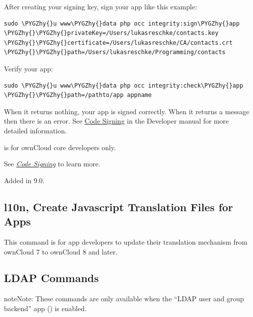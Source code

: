 \documentclass[letterpaper,10pt,english]{sphinxmanual}
\def\PYGZhy{\char`\-}
\begin{document}
After creating your signing key, sign your app like this example:

\begin{Verbatim}[commandchars=\\\{\}]
sudo \PYGZhy{}u www\PYGZhy{}data php occ integrity:sign\PYGZhy{}app \PYGZhy{}\PYGZhy{}privateKey=/Users/lukasreschke/contacts.key \PYGZhy{}\PYGZhy{}certificate=/Users/lukasreschke/CA/contacts.crt \PYGZhy{}\PYGZhy{}path=/Users/lukasreschke/Programming/contacts
\end{Verbatim}

Verify your app:

\begin{Verbatim}[commandchars=\\\{\}]
sudo \PYGZhy{}u www\PYGZhy{}data php occ integrity:check\PYGZhy{}app \PYGZhy{}\PYGZhy{}path=/pathto/app appname
\end{Verbatim}

When it returns nothing, your app is signed correctly. When it returns a message then there is an error. See \href{https://doc.owncloud.org/server/9.0/developer\_manual/app/code\_signing.html\#how-to-get-your-app-signed}{Code Signing} in the Developer manual for more detailed information.

 is for ownCloud core developers only.

See {\hyperref[issues/code_signing::doc]{\emph{Code Signing}}} to learn more.

Added in 9.0.


\subsection{l10n, Create Javascript Translation Files for Apps}
\label{configuration_server/occ_command:l10n-create-javascript-translation-files-for-apps}\label{configuration_server/occ_command:create-javascript-translation-files-label}
This command is for app developers to update their translation mechanism from
ownCloud 7 to ownCloud 8 and later.


\subsection{LDAP Commands}
\label{configuration_server/occ_command:ldap-commands}\label{configuration_server/occ_command:ldap-commands-label}
\begin{notice}{note}{Note:}
These commands are only available when the ``LDAP user and group backend'' app
() is enabled.
\end{notice}
\end{document}
